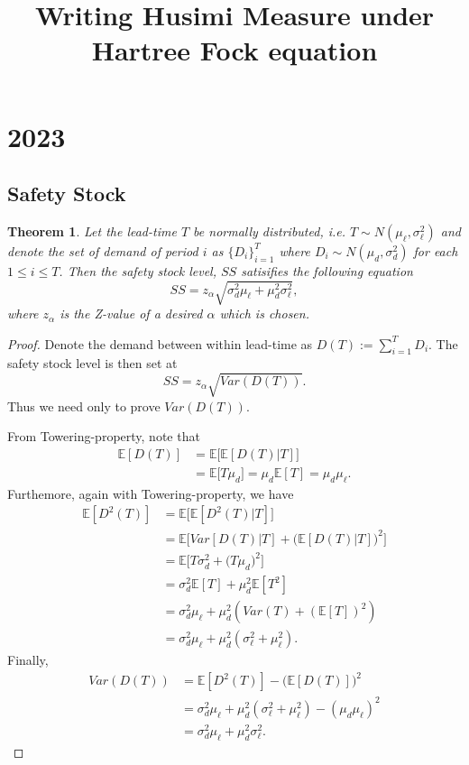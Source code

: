 \documentclass[10pt]{article}
\title{Writing Husimi Measure under Hartree Fock equation}
\date{}
\author{}
\theoremstyle{remark}
\theoremstyle{plain}
\newtheorem{Theorem}{Theorem}[section]
\numberwithin{equation}{section}
\renewcommand{\leq}{\leqslant}
\begin{document}
	
\section{2023}

\subsection{Safety Stock}
\begin{Theorem}
	Let the lead-time $T$ be normally distributed, i.e. $T\sim N(\mu_\ell, \sigma^2_\ell)$ and denote the set of demand of period $i$ as $\{D_i\}_{i=1}^T$ where $D_i \sim N(\mu_d, \sigma^2_d)$ for each $1\leq i \leq T$. Then the safety stock level, $SS$ satisifies the following equation
		\[
		SS = z_\alpha \sqrt{\sigma_d^2 \mu_\ell + \mu_d^2 \sigma^2_\ell},
		\]
		where $z_\alpha$ is the Z-value of a desired $\alpha$ which is chosen.
\end{Theorem}

\begin{proof}
	Denote the demand between within lead-time as $D(T) := \sum_{i=1}^T D_i$. The safety stock level is then set at
		\[
		SS = z_\alpha \sqrt{Var(D(T))}.
		\]
	Thus we need only to prove $Var(D(T))$. 
	
	From Towering-property, note that 
	\begin{align*}
		\mathbb{E}[D(T)] & = \mathbb{E} \big[\mathbb{E}[D(T)|T]\big]\\
		&
		= \mathbb{E}\big[T \mu_d\big] = \mu_d \mathbb{E}[T] = \mu_d \mu_\ell.
	\end{align*}
	Furthemore, again with Towering-property, we have
	\begin{align*}
		\mathbb{E}[D^2(T)] & = \mathbb{E} \big[\mathbb{E}[D^2(T)|T]\big]
			\\
			& = \mathbb{E}\big[Var[D(T)|T] + \big(\mathbb{E}[D(T)|T]\big)^2\big]
			\\			
			& = \mathbb{E}\big[T \sigma_d^2 + \big(T \mu_d \big)^2\big]
			\\
			& = \sigma_d^2 \mathbb{E}[T] + \mu_d^2\mathbb{E}[T^2]
			\\
			& =  \sigma_d^2 \mu_\ell + \mu_d^2\left(Var(T) + (\mathbb{E}[T])^2\right)
			\\
			& = \sigma_d^2 \mu_\ell + \mu_d^2\left(\sigma^2_\ell+ \mu_\ell^2\right).
	\end{align*}
Finally,
	\begin{align*}
		Var(D(T)) &= \mathbb{E}[D^2(T)] - \big(\mathbb{E}[D(T)]\big)^2
		\\
		& =  \sigma_d^2 \mu_\ell + \mu_d^2\left(\sigma^2_\ell+ \mu_\ell^2\right) - (\mu_d \mu_\ell)^2
		\\
		& = \sigma_d^2 \mu_\ell + \mu_d^2 \sigma^2_\ell.
	\end{align*}
\end{proof}
\clearpage
\end{document}
